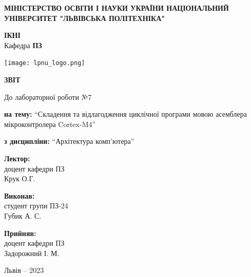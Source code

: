 \documentclass[12pt]{extarticle}
\begin{document}
\begin{titlepage}
    \begin{center}
        \textbf{\normalsize{\MakeUppercase{
            Міністерство Освіти і науки України
            Національний університет "Львівська політехніка"
        }}}

        \begin{flushright}
        \textbf{ІКНІ}\\
        Кафедра \textbf{ПЗ}
        \end{flushright}
        \vspace{15mm}

        \texttt{[image: lpnu\_logo.png]}

        \vspace*{\fill}

        \textbf{\normalsize{\MakeUppercase{Звіт}}}
            
        До лабораторної роботи №7

        \textbf{на тему:} “Складення та відлагодження циклічної програми мовою асемблера
мікроконтролера Cortex-M4”

        \textbf{з дисципліни:} “Архітектура комп’ютера”
            
        \vspace*{\fill}

        \begin{flushright}

            \textbf{Лектор:}\\
            доцент кафедри ПЗ\\
            Крук О.Г.\\
            \vspace{12pt}

            \textbf{Виконав:}\\
            студент групи ПЗ-24\\
            Губик А. С.\\
            \vspace{12pt}

            \textbf{Прийняв:}\\
            доцент кафедри ПЗ\\
            Задорожний І. М.\\
        \vspace{12pt}
        \end{flushright}

        Львів -- 2023
            
            
    \end{center}
\end{titlepage}
\end{document}
